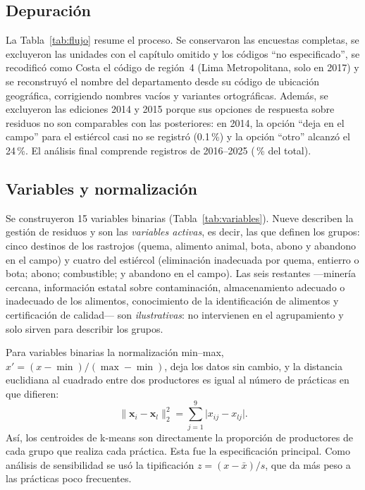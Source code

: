 \documentclass[10pt,twocolumn,a4paper]{article}
\begin{document}
\subsection{Depuración}
La Tabla~\ref{tab:flujo} resume el proceso. Se conservaron las encuestas completas, se excluyeron las unidades con el capítulo omitido y los códigos ``no especificado'', se recodificó como Costa el código de región~4 (Lima Metropolitana, solo en 2017) y se reconstruyó el nombre del departamento desde su código de ubicación geográfica, corrigiendo nombres vacíos y variantes ortográficas. Además, se excluyeron las ediciones 2014 y 2015 porque sus opciones de respuesta sobre residuos no son comparables con las posteriores: en 2014, la opción ``deja en el campo'' para el estiércol casi no se registró (0.1\,\%) y la opción ``otro'' alcanzó el 24\,\%. El análisis final comprende \nValid{} registros de 2016--2025 (\pValid\,\% del total).



\subsection{Variables y normalización}
Se construyeron 15 variables binarias (Tabla~\ref{tab:variables}). Nueve describen la gestión de residuos y son las \textit{variables activas}, es decir, las que definen los grupos: cinco destinos de los rastrojos (quema, alimento animal, bota, abono y abandono en el campo) y cuatro del estiércol (eliminación inadecuada por quema, entierro o bota; abono; combustible; y abandono en el campo). Las seis restantes ---minería cercana, información estatal sobre contaminación, almacenamiento adecuado o inadecuado de los alimentos, conocimiento de la identificación de alimentos y certificación de calidad--- son \textit{ilustrativas}: no intervienen en el agrupamiento y solo sirven para describir los grupos.



Para variables binarias la normalización min--max, $x'=(x-\min)/(\max-\min)$, deja los datos sin cambio, y la distancia euclidiana al cuadrado entre dos productores es igual al número de prácticas en que difieren:
\begin{equation}
\lVert \mathbf{x}_i-\mathbf{x}_l\rVert_2^2=\sum_{j=1}^{9}\lvert x_{ij}-x_{lj}\rvert .
\label{eq:hamming}
\end{equation}
Así, los centroides de k-means son directamente la proporción de productores de cada grupo que realiza cada práctica. Esta fue la especificación principal. Como análisis de sensibilidad se usó la tipificación $z=(x-\bar{x})/s$, que da más peso a las prácticas poco frecuentes.
\end{document}

